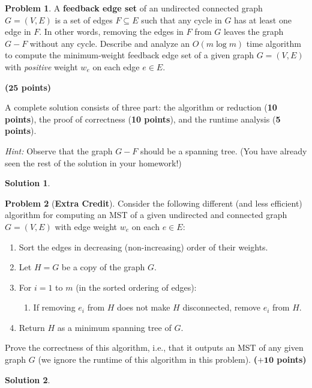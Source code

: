 \documentclass{article}
\theoremstyle{definition}
\newtheorem{problem}{Problem}
\newtheorem*{solution*}{Solution}
\newenvironment{solution}{\begin{solution*}}{{} \end{solution*}}
\newcommand{\grade}[1]{\hfill{\textbf{($\mathbf{#1}$ points)}}}
\begin{document}
\newpage


\begin{problem}\label{mst}
	A \textbf{feedback edge set} of an undirected connected graph $G=(V,E)$ is a set of edges $F \subseteq E$ such that any cycle in $G$ has at least one edge in $F$. In other words, removing the edges in $F$ from $G$ 
	leaves the graph $G-F$ without any cycle. Describe and analyze an $O(m\log{m})$ time algorithm to compute the minimum-weight feedback edge set of a given graph $G=(V,E)$ with \emph{positive} weight $w_e $ on each edge $e \in E$. 

	\grade{25}
	
	A complete solution consists of three part: the algorithm or reduction (\textbf{10 points}), the proof of correctness (\textbf{10 points}), 
	and the runtime analysis (\textbf{5 points}). 


	\smallskip
	\emph{Hint:} Observe that the graph $G - F$ should be a spanning tree. (You have already seen the rest of the solution in your homework!) 
\end{problem}

\begin{solution}

\end{solution}
	
\newpage


\begin{problem}[\textbf{Extra Credit}]\label{mst}
	Consider the following different (and less efficient) algorithm for computing an MST of a given undirected and connected graph $G=(V,E)$ with edge weight $w_e$ on each $e \in E$: 
	\begin{enumerate}
		\item Sort the edges in decreasing (non-increasing) order of their weights. 
		\item Let $H = G$ be a copy of the graph $G$. 
		\item For $i=1$ to $m$ (in the sorted ordering of edges): 
		\begin{enumerate}
			\item If removing $e_i$ from $H$ does not make $H$ disconnected, remove $e_i$ from $H$. 
		\end{enumerate}
		\item Return $H$ as a minimum spanning tree of $G$. 
	\end{enumerate}
	Prove the correctness of this algorithm, i.e., that it outputs an MST of any given graph $G$ (we ignore the runtime of this algorithm in this problem). \grade{+10}
\end{problem}

\begin{solution}

\end{solution}
	
\end{document}
